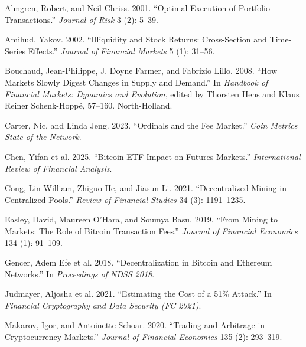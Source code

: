 \documentclass[
  11pt,
]{article}
\newlength{\cslhangindent}
\newlength{\cslentryspacingunit} %
\newenvironment{CSLReferences}[2] %
 {%
  \setlength{\parindent}{0pt}
  \ifodd #1
  \let\oldpar\par
  \def\par{\hangindent=\cslhangindent\oldpar}
  \fi
  \setlength{\parskip}{#2\cslentryspacingunit}
 }%
 {}
\begin{document}
\hypertarget{refs}{}
\begin{CSLReferences}{1}{0}
\leavevmode{}%
Almgren, Robert, and Neil Chriss. 2001. {``Optimal Execution of
Portfolio Transactions.''} \emph{Journal of Risk} 3 (2): 5--39.

\leavevmode{}%
Amihud, Yakov. 2002. {``Illiquidity and Stock Returns: Cross-Section and
Time-Series Effects.''} \emph{Journal of Financial Markets} 5 (1):
31--56.

\leavevmode{}%
Bouchaud, Jean-Philippe, J. Doyne Farmer, and Fabrizio Lillo. 2008.
{``How Markets Slowly Digest Changes in Supply and Demand.''} In
\emph{Handbook of Financial Markets: Dynamics and Evolution}, edited by
Thorsten Hens and Klaus Reiner Schenk-Hoppé, 57--160. North-Holland.

\leavevmode{}%
Carter, Nic, and Linda Jeng. 2023. {``Ordinals and the Fee Market.''}
\emph{Coin Metrics State of the Network}.

\leavevmode{}%
Chen, Yifan et al. 2025. {``Bitcoin {ETF} Impact on Futures Markets.''}
\emph{International Review of Financial Analysis}.

\leavevmode{}%
Cong, Lin William, Zhiguo He, and Jiasun Li. 2021. {``Decentralized
Mining in Centralized Pools.''} \emph{Review of Financial Studies} 34
(3): 1191--1235.

\leavevmode{}%
Easley, David, Maureen O'Hara, and Soumya Basu. 2019. {``From Mining to
Markets: The Role of {Bitcoin} Transaction Fees.''} \emph{Journal of
Financial Economics} 134 (1): 91--109.

\leavevmode{}%
Gencer, Adem Efe et al. 2018. {``Decentralization in {Bitcoin} and
{Ethereum} Networks.''} In \emph{Proceedings of NDSS 2018}.

\leavevmode{}%
Judmayer, Aljosha et al. 2021. {``Estimating the Cost of a 51\%
Attack.''} In \emph{Financial Cryptography and Data Security (FC 2021)}.

\leavevmode{}%
Makarov, Igor, and Antoinette Schoar. 2020. {``Trading and Arbitrage in
Cryptocurrency Markets.''} \emph{Journal of Financial Economics} 135
(2): 293--319.


\end{CSLReferences}
\end{document}
